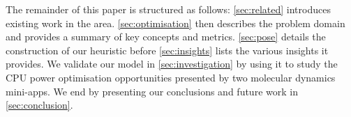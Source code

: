The remainder of this paper is structured as follows: \autoref{sec:related} introduces existing work in the area. 
\autoref{sec:optimisation} then describes the problem domain and provides a summary of key concepts and metrics.
\autoref{sec:pose} details the construction of our heuristic before \autoref{sec:insights} lists the various insights it provides.
We validate our model in \autoref{sec:investigation} by using it to study the CPU power optimisation opportunities presented by two molecular dynamics mini-apps. 
We end by presenting our conclusions and future work in \autoref{sec:conclusion}.
